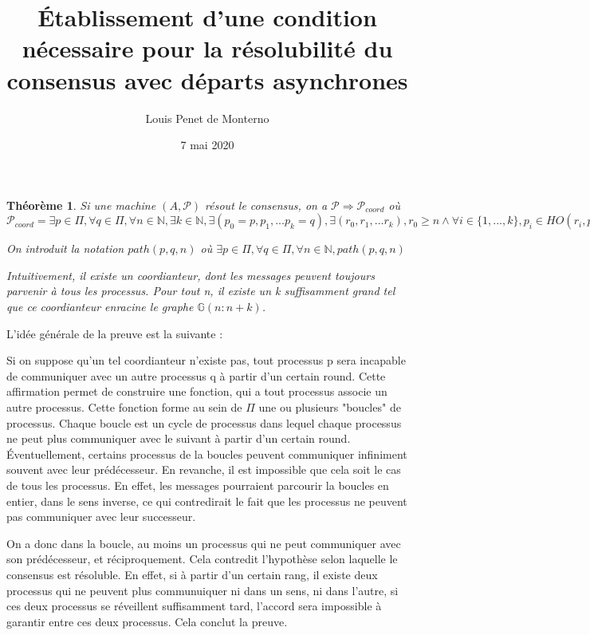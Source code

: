 \documentclass{article}
\title{Établissement d'une condition nécessaire pour la résolubilité du consensus avec départs asynchrones}
\date{7 mai 2020}
\author{Louis Penet de Monterno}
\newtheorem{lemma}{Théorème}
\begin{document}
\maketitle

\begin{lemma}

Si une machine $(A, \mathcal{P})$ résout le consensus, on a
$\mathcal{P} \Rightarrow \mathcal{P}_{coord}$ où $\mathcal{P}_{coord} = \exists p \in \Pi,
\forall q \in \Pi, \forall n \in \mathds{N}, \exists k \in \mathds{N},
\exists (p_0 = p, p_1, ... p_k = q), \exists (r_0, r_1, ... r_k), r_0 \geq n
\wedge \forall i \in \{1, ..., k\}, p_i \in HO(r_i, p_{i-1}) \wedge r_i > r_{i-1}$

On introduit la notation $path(p, q, n)$ où
$\exists p \in \Pi, \forall q \in \Pi, \forall n \in \mathds{N}, path(p, q, n)$ 

Intuitivement, il existe un coordianteur, dont les messages peuvent toujours parvenir à tous les processus.
Pour tout n, il existe un k suffisamment grand tel que ce coordianteur enracine le graphe $\mathds{G}(n:n+k)$.

\end{lemma}

L'idée générale de la preuve est la suivante :

Si on suppose qu'un tel coordianteur n'existe pas, tout processus p sera incapable de communiquer avec un autre processus q à partir d'un certain round. Cette affirmation permet de construire
une fonction, qui a tout processus associe un autre processus. Cette fonction forme au sein de $\Pi$ une ou plusieurs "boucles" de processus. Chaque boucle est un cycle de processus dans lequel
chaque processus ne peut plus communiquer avec le suivant à partir d'un certain round. Éventuellement, certains processus de la boucles peuvent communiquer infiniment souvent avec leur prédécesseur.
En revanche, il est impossible que cela soit le cas de tous les processus. En effet, les messages pourraient parcourir la boucles en entier, dans le sens inverse, ce qui contredirait le fait
que les processus ne peuvent pas communiquer avec leur successeur.

On a donc dans la boucle, au moins un processus qui ne peut communiquer avec son prédécesseur, et réciproquement. Cela contredit l'hypothèse selon laquelle le consensus est résoluble. En effet, si 
à partir d'un certain rang, il existe deux processus qui ne peuvent plus communuiquer ni dans un sens, ni dans l'autre, si ces deux processus se réveillent suffisamment tard, l'accord sera impossible
à garantir entre ces deux processus. Cela conclut la preuve.
\end{document}

